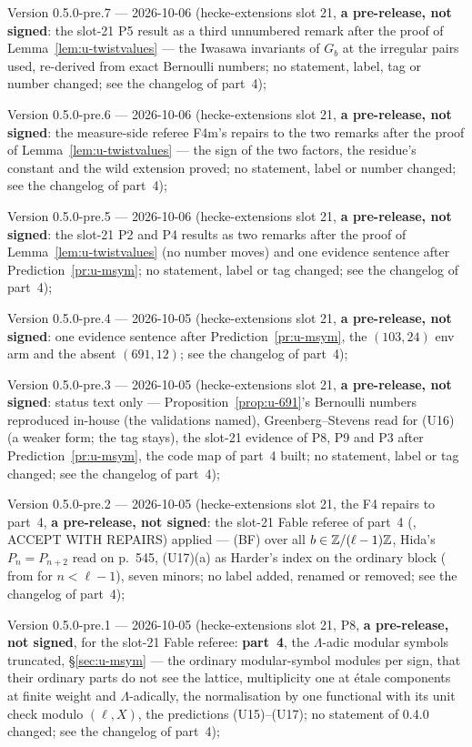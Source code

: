 \documentclass[11pt]{article}
\newcommand{\Iw}{\Lambda}                         %
\newcommand{\Pk}[1]{P_{#1}}                       %
\begin{document}
Version 0.5.0-pre.7 --- 2026-10-06 (hecke-extensions slot 21, \textbf{a pre-release, not signed}: the slot-21 P5 result as a third unnumbered remark after the proof of
Lemma~\ref{lem:u-twistvalues} --- the Iwasawa invariants of $G_b$ at the irregular pairs used, re-derived from exact Bernoulli numbers; no statement, label, tag or number changed; see the changelog of part~4);

Version 0.5.0-pre.6 --- 2026-10-06 (hecke-extensions slot 21, \textbf{a pre-release, not signed}: the measure-side referee F4m's repairs to the two remarks after the proof of
Lemma~\ref{lem:u-twistvalues} --- the sign of the two factors, the residue's constant and the wild extension proved; no statement, label or number changed; see the changelog of part~4);

Version 0.5.0-pre.5 --- 2026-10-06 (hecke-extensions slot 21, \textbf{a pre-release, not signed}: the slot-21 P2 and P4 results as two remarks after the proof of
Lemma~\ref{lem:u-twistvalues} (no number moves) and one evidence sentence after Prediction~\ref{pr:u-msym}; no statement, label or tag changed; see the changelog of part~4);

Version 0.5.0-pre.4 --- 2026-10-05 (hecke-extensions slot 21, \textbf{a pre-release, not signed}: one evidence sentence after Prediction~\ref{pr:u-msym}, the $(103,24)$ env arm and the
absent $(691,12)$; see the changelog of part~4);

Version 0.5.0-pre.3 --- 2026-10-05 (hecke-extensions slot 21, \textbf{a pre-release, not signed}: status text only --- Proposition~\ref{prop:u-691}'s Bernoulli
numbers reproduced in-house (the validations named), Greenberg--Stevens read for (U16) (a weaker form; the tag stays), the slot-21 evidence of P8, P9 and P3 after
Prediction~\ref{pr:u-msym}, the code map of part~4 built; no statement, label or tag changed; see the changelog of part~4);

Version 0.5.0-pre.2 --- 2026-10-05 (hecke-extensions slot 21, the F4 repairs to part~4, \textbf{a pre-release, not signed}: the slot-21 Fable referee of part~4
(, ACCEPT WITH REPAIRS) applied --- (BF) over all $b\in\mathbb{Z}/(\ell-1)\mathbb{Z}$, Hida's $P_n=\Pk{n+2}$ read on p.~545, (U17)(a) as Harder's
index on the ordinary block (\PROVED{} from \STD{} for $n<\ell-1$), seven minors; no label added, renamed or removed; see the changelog of part~4);

Version 0.5.0-pre.1 --- 2026-10-05 (hecke-extensions slot 21, P8, \textbf{a pre-release, not signed}, for the slot-21 Fable referee: \textbf{part~4}, the
$\Iw$-adic modular symbols truncated, \S\ref{sec:u-msym} --- the ordinary modular-symbol modules per sign, that their ordinary parts do not see the lattice, multiplicity one at étale
components at finite weight and $\Iw$-adically, the normalisation by one functional with its unit check modulo $(\ell,X)$, the predictions (U15)--(U17); no statement of 0.4.0 changed;
see the changelog of part~4);
\end{document}
